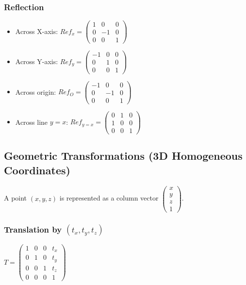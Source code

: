 \subsubsection*{Reflection}
\begin{itemize}
    \item Across X-axis:
    $Ref_x = \begin{pmatrix} 1 & 0 & 0 \\ 0 & -1 & 0 \\ 0 & 0 & 1 \end{pmatrix}$
    \item Across Y-axis:
    $Ref_y = \begin{pmatrix} -1 & 0 & 0 \\ 0 & 1 & 0 \\ 0 & 0 & 1 \end{pmatrix}$
    \item Across origin:
    $Ref_O = \begin{pmatrix} -1 & 0 & 0 \\ 0 & -1 & 0 \\ 0 & 0 & 1 \end{pmatrix}$
    \item Across line $y=x$:
    $Ref_{y=x} = \begin{pmatrix} 0 & 1 & 0 \\ 1 & 0 & 0 \\ 0 & 0 & 1 \end{pmatrix}$
\end{itemize}

\subsection*{Geometric Transformations (3D Homogeneous Coordinates)}
A point $(x, y, z)$ is represented as a column vector $\begin{pmatrix} x \\ y \\ z \\ 1 \end{pmatrix}$.

\subsubsection*{Translation by $(t_x, t_y, t_z)$}
$T = \begin{pmatrix} 1 & 0 & 0 & t_x \\ 0 & 1 & 0 & t_y \\ 0 & 0 & 1 & t_z \\ 0 & 0 & 0 & 1 \end{pmatrix}$

